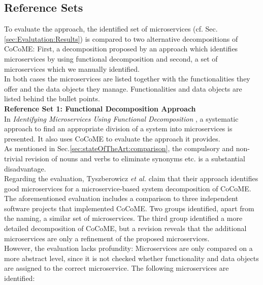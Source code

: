 \subsection{Reference Sets}
\label{sec:Evaluation:ReferenceSets}
To evaluate the approach, the identified set of microservices (cf. Sec.\ref{sec:Evalutation:Results}) is compared to two alternative decompositions of CoCoME: First, a decomposition proposed by an approach which identifies microservices by using functional decomposition\cite{FunctionalDecompositionHeinrich} and second, a set of microservices which we manually identified\cite{NikoCoCoMEImpl}. \\
In both cases the microservices are listed together with the functionalities they offer and the data objects they manage. Functionalities and data objects are listed behind the bullet points. \\

\noindent
\textbf{Reference Set 1: Functional Decomposition Approach} \\
In \textit{Identifying Microservices Using Functional Decomposition} \cite{FunctionalDecompositionHeinrich}, a systematic approach to find an appropriate division of a system into microservices is presented. It also uses CoCoME to evaluate the approach it provides. \\
As mentioned in Sec.\ref{sec:stateOfTheArt:comparison}, the compulsory and non-trivial revision of nouns and verbs to eliminate synonyms etc. is a substantial disadvantage.\\
Regarding the evaluation, Tyszberowicz \textit{et al.} claim that their approach identifies good microservices for a microservice-based system decomposition of CoCoME. The aforementioned evaluation includes a comparison to three independent software projects that implemented CoCoME. Two groups identified, apart from the naming, a similar set of microservices. The third group identified a more detailed decomposition of CoCoME, but a revision reveals that the additional microservices are only a refinement of the proposed microservices. \\
However, the evaluation lacks profundity: Microservices are only compared on a more abstract level, since it is not checked whether functionality and data objects are assigned to the correct microservice. The following microservices are identified: 



